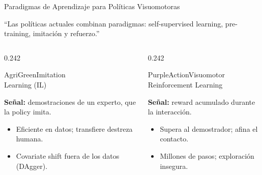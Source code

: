 \documentclass[aspectratio=169,10pt,xcolor={dvipsnames,table}]{beamer}
\newcommand{\BannerFont}{\fontsize{7.5}{9.2}\selectfont\bfseries}       %
\newcommand{\FootnoteFont}{\fontsize{5}{6.2}\selectfont}                %
\newcommand{\BannerArc}{1.5pt}             %
\newcommand{\BannerRule}{0.5pt}            %
\newcommand{\BannerLeftRule}{2.5pt}        %
\newcommand{\BannerCentral}[2][UCNCyan]{%
  \begin{tcolorbox}[
    enhanced,
    colback=#1!10,
    colframe=#1,
    boxrule=\BannerRule,
    leftrule=\BannerLeftRule,
    arc=\BannerArc,
    top=0.35mm, bottom=0.35mm, left=2mm, right=2mm
  ]
    {\BannerFont\raggedright\textcolor{UCNBlue}{#2}\par}
  \end{tcolorbox}%
  \vspace{-2.5mm}%
}
\newcommand{\CheckMark}{\textcolor{AgriGreen}{$\checkmark$}}
\newcommand{\CrossMark}{\textcolor{AlertRed}{$\times$}}
\newcommand{\RefNote}[1]{{\FootnoteFont\textcolor{TextDark!65}{\cite{#1}}}}
\begin{document}
\begin{frame}{Paradigmas de Aprendizaje para Políticas Visuomotoras}
  \BannerCentral[UCNBlue]{``Las políticas actuales combinan paradigmas: self-supervised learning, pre-training, imitación y refuerzo.''}
  \vspace{0.8mm}
  \begin{columns}[T, onlytextwidth]
    \begin{column}{0.242\textwidth}
      \begin{Card}[height=34mm, left=1.1mm, right=1.1mm]{AgriGreen}{\fontsize{6.2}{7.2}\selectfont Imitation\\Learning (IL)}
        {\fontsize{5.2}{6.3}\selectfont\raggedright
        \textbf{Señal:} demostraciones de un experto, que la policy imita.\par
        \begin{itemize}\setlength{\itemsep}{0.4pt}
          \item[\CheckMark] Eficiente en datos; transfiere destreza humana.
          \item[\CrossMark] Covariate shift fuera de los datos (DAgger).
        \end{itemize}
        \RefNote{argall2009survey,osa2018algorithmic,ross2011dagger}\par}
      \end{Card}
    \end{column}
    \begin{column}{0.242\textwidth}
      \begin{Card}[height=34mm, left=1.1mm, right=1.1mm]{PurpleAction}{\fontsize{6.2}{7.2}\selectfont Visuomotor\\Reinforcement Learning}
        {\fontsize{5.2}{6.3}\selectfont\raggedright
        \textbf{Señal:} reward acumulado durante la interacción.\par
        \begin{itemize}\setlength{\itemsep}{0.4pt}
          \item[\CheckMark] Supera al demostrador; afina el contacto.
          \item[\CrossMark] Millones de pasos; exploración insegura.
        \end{itemize}
        \RefNote{kalashnikov2018qtopt,elguea2023rl,zhang2025reinflow}\par}

\end{Card}
\end{column}
\end{columns}
\end{frame}
\end{document}
